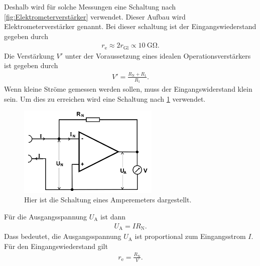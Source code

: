 Deshalb wird für solche Messungen eine Schaltung nach \cref{fig:Elektrometerverstärker} verwendet.
Dieser Aufbau wird Elektrometerverstärker genannt.
Bei dieser schaltung ist der Eingangswiederstand gegeben durch
\begin{align}
	r_\text{e}\approx 2r_\text{Gl}\propto \SI{10}{\giga\ohm}.
\end{align}
Die Verstärkung $V'$ unter der Voraussetzung eines idealen Operationsverstärkers ist gegeben durch
\begin{align}
	V'=\frac{R_\text{N}+R_1}{R_1 }.
\end{align}
\indent
Wenn kleine Ströme gemessen werden sollen, muss der Eingangswiderstand klein sein.
Um dies zu erreichen wird eine Schaltung nach \cref{fig:Amperemeter} verwendet.
\begin{figure}[h!]
	\centering
	\includegraphics[width = 0.6\textwidth]{../Grafiken/Amperemeter.png}
	\caption{Hier ist die Schaltung eines Amperemeters dargestellt. \cite{V51}\label{fig:Amperemeter}}
\end{figure}
Für die Ausgangsspannung $U_\text{A}$ ist dann
\begin{align}
	U_\text{A}=IR_\text{N}.\label{eq:amperemeter_strom}
\end{align}
Dass bedeutet, die Ausgangsspannung $U_\text{A}$ ist proportional zum Eingangsstrom $I$.
Für den Eingangswiederstand gilt\\
\begin{align*}
	r_\text{e}=\frac{R_\text{N}}{V}.
\end{align*}
